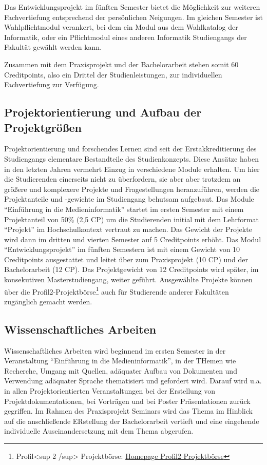 Das Entwicklungsprojekt im fünften Semester bietet die Möglichkeit zur
weiteren Fachvertiefung entsprechend der persönlichen Neigungen. Im
gleichen Semester ist Wahlpflichtmodul verankert, bei dem ein Modul aus
dem Wahlkatalog der Informatik, oder ein Pflichtmodul eines anderen
Informatik Studiengangs der Fakultät gewählt werden kann.

Zusammen mit dem Praxisprojekt und der Bachelorarbeit stehen somit 60
Creditpoints, also ein Drittel der Studienleistungen, zur individuellen
Fachvertiefung zur Verfügung.

\subsection{Projektorientierung und Aufbau der
Projektgrößen}\label{projektorientierung-und-aufbau-der-projektgruxf6uxdfen}

Projektorientierung und forschendes Lernen sind seit der
Erstakkreditierung des Studiengangs elementare Bestandteile des
Studienkonzepts. Diese Ansätze haben in den letzten Jahren vermehrt
Einzug in verschiedene Module erhalten. Um hier die Studierenden
einerseits nicht zu überfordern, sie aber aber trotzdem an größere und
komplexere Projekte und Fragestellungen heranzuführen, werden die
Projektanteile und -gewichte im Studiengang behutsam aufgebaut. Das
Module ``Einführung in die Medieninformatik'' startet im ersten Semester
mit einem Projektanteil von 50\% (2,5 CP) um die Studierenden initial
mit dem Lehrformat ``Projekt'' im Hochschulkontext vertraut zu machen.
Das Gewicht der Projekte wird dann im dritten und vierten Semester auf 5
Creditpoints erhöht. Das Modul ``Entwicklungsprojekt'' im fünften
Semestern ist mit einem Gewicht von 10 Creditpoints ausgestattet und
leitet über zum Praxisprojekt (10 CP) und der Bachelorarbeit (12 CP).
Das Projektgewicht von 12 Creditpoints wird später, im konsekutiven
Masterstudiengang, weiter geführt. Ausgewählte Projekte können über die
Profil2-Projektbörse\footnote{Profil\textless{}sup 2 /sup\textgreater{}
  Projektbörse:
  \href{http://projektboerse-profil2.th-koeln.de/}{Homepage Profil2
  Projektbörse}} auch für Studierende anderer Fakultäten zugänglich
gemacht werden.

\subsection{Wissenschaftliches
Arbeiten}\label{wissenschaftliches-arbeiten}

Wissenschaftliches Arbeiten wird beginnend im ersten Semester in der
Veranstaltung ``Einführung in die Medieninformatik'', in der THemen wie
Recherche, Umgang mit Quellen, adäquater Aufbau von Dokumenten und
Verwendung adäquater Sprache thematisiert und gefordert wird. Darauf
wird u.a. in allen Projektorientierten Veranstaltungen bei der
Erstellung von Projektdokumentationen, bei Vorträgen und bei Poster
Präsentationen zurück gegriffen. Im Rahmen des Praxisprojekt Seminars
wird das Thema im Hinblick auf die anschließende ERstellung der
Bachelorarbeit vertieft und eine eingehende individuelle
Auseinandersetzung mit dem Thema abgerufen.


